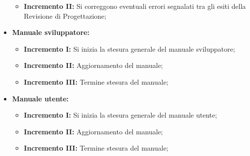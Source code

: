 \documentclass[../piano_di_progetto.tex]{subfiles}
\begin{document}
\begin{itemize}
\begin{itemize}
            \item \textbf{Incremento II:} Si correggono eventuali errori segnalati tra gli esiti della Revisione di Progettazione;
        \end{itemize}
        \item \textbf{Manuale sviluppatore:}
        \begin{itemize}
            \item \textbf{Incremento I:} Si inizia la stesura generale del manuale sviluppatore;
            \item \textbf{Incremento II:} Aggiornamento del manuale;
            \item \textbf{Incremento III:} Termine stesura del manuale;
        \end{itemize}
        \item \textbf{Manuale utente:}
        \begin{itemize}
            \item \textbf{Incremento I:} Si inizia la stesura generale del manuale utente;
            \item \textbf{Incremento II:} Aggiornamento del manuale;
            \item \textbf{Incremento III:} Termine stesura del manuale;
        \end{itemize}
\end{itemize}
\end{document}

